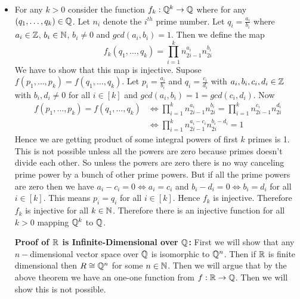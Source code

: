 \documentclass[a4paper, 11pt]{article}
\begin{document}
{\begin{itemize}
		  \textbf{Proof of $\boldsymbol{\bbR}$ is Infinite-Dimensional over $\boldsymbol{\bbQ}$:} Suppose $\bbR$ is not infinite-dimensional over $\bbQ$. Let dimension of $\bbR$ over $\bbQ$ is $n\in\bbN$. Then suppose $p_1,\dots, p_{n+1}$  be any $n+1$ prime numbers. By the above we have that $\log p_1,\dots, \log p_{n+1}$ are linearly independent over $\bbQ$. But $\dim \bbR=n$ over $\bbQ$. So $\bbR$ can not have a set of linearly independent vectors with size more than its dimension. Hence contradiction. $\bbR$ can not be a finite-dimensional vector space over $\bbQ$. Therefore $\bbR$ is an infinite-dimensional vector space over $\bbQ$. 
		
		
		\item For any $k>0$ consider the function $f_k:\mathbb{Q}^k\to \mathbb{Q}$ where for any $(q_1,\dots, q_k)\in\mathbb{Q}$. Let $n_i$ denote the $i^{th}$ prime number. Let $q_i=\frac{a_i}{b_i}$ where $a_i\in\mathbb{Z}$, $b_i\in\mathbb{N}$, $b_i\neq 0$ and $gcd(a_i,b_i)=1$. Then we define the map $$f_k(q_1,\dots, q_k)=\prod_{i=1}^k n_{2i-1}^{a_i}n_{2i}^{b_i}$$We have to show that this map is injective. Supose $f(p_1,\dots,p_k)=f(q_1,\dots, q_k)$. Let $p_i=\frac{a_i}{b_i}$ and $q_i=\frac{c_i}{d_i} $ with $a_i,b_i,c_i,d_i\in\mathbb{Z}$ with $b_i,d_i\neq 0$ for all $i\in[k]$ and $gcd(a_i,b_i)=1=gcd(c_i,d_i)$. Now \begin{align*}
			f(p_1,\dots,p_k)=f(q_1,\dots, q_k) & \iff \prod_{i=1}^k n_{2i-1}^{a_i}n_{2i}^{b_i}=\prod_{i=1}^k n_{2i-1}^{c_i}n_{2i}^{d_i}\\
			& \iff \prod_{i=1}^k n_{2i-1}^{a_i-c_i}n_{2i}^{b_i-d_i}=1
		\end{align*}Hence we are getting product of some integral powers of first $k$ primes is 1. This is not possible unless all the powers are zero because primes doesn't divide each other. So unless the powers are zero there is no way canceling prime power by a bunch of other prime powers. But if all the prime powers are zero then we have $a_i-c_i=0\iff a_i=c_i$ and $b_i-d_i=0\iff b_i=d_i$ for all $i\in[k]$. This means $p_i=q_i$ for all $i\in[k]$. Hence $f_k$ is injective. Therefore $f_k$ is injective for all $k\in \mathbb{N}$. Therefore there is an injective function for all $k>0$ mapping $\mathbb{Q}^k$ to $\bbQ$. 
	\vspace*{2mm}
	
	\textbf{Proof of $\boldsymbol{\bbR}$ is Infinite-Dimensional over $\boldsymbol{\bbQ}$:} First we will show that any $n-$dimensional vector space over $\bbQ$ is isomorphic to $\mathbb{Q}^n$. Then if $\bbR$ is finite dimensional then $R\cong \mathbb{Q}^n$ for some $n\in\bbN$. Then we will argue that by the above theorem we have an one-one function from $f:\mathbb{R}\to \mathbb{Q}$. Then we will show this is not possible.\parinn
	

\end{itemize}}
\end{document}
